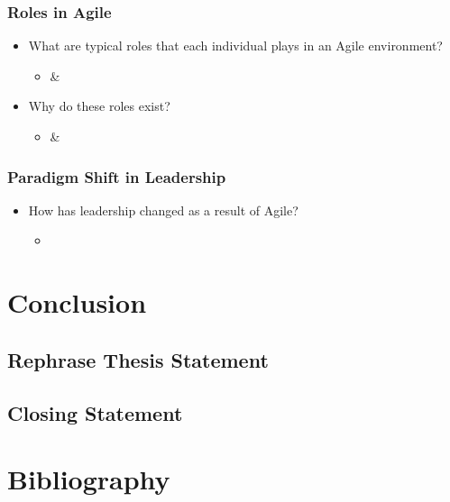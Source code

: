 \documentclass[11pt,a4paper]{article}
\begin{document}
		\subsubsection{Roles in Agile}
		\begin{itemize}[noitemsep]
			\item What are typical roles that each individual plays in an Agile environment?
			\begin{itemize}
				\item \cite{bosch_2014} \& \cite{meyer_2014}
			\end{itemize}
			\item Why do these roles exist?
			\begin{itemize}
				\item \cite{bosch_2014} \& \cite{meyer_2014}
			\end{itemize}
		\end{itemize}
		\subsubsection{Paradigm Shift in Leadership}
		\begin{itemize}[noitemsep]
			\item How has leadership changed as a result of Agile?
			\begin{itemize}
				\item \cite{bosch_2014}
			\end{itemize}
		\end{itemize}

\section{Conclusion}
	\subsection{Rephrase Thesis Statement}
	\subsection{Closing Statement}

\newpage
\section{Bibliography}
\nocite{*}


\end{document}
